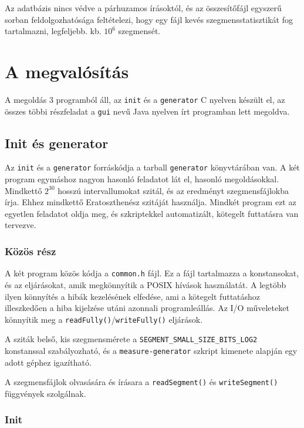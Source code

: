 Az adatbázis nincs védve a párhuzamos írásoktól, és az összesítőfájl egyszerű sorban feldolgozhatósága feltételezi, hogy egy fájl kevés szegmensstatisztikát fog tartalmazni, legfeljebb. kb. $10^6$ szegmensét.

\section{A megvalósítás}

A megoldás 3 programból áll, az \texttt{init} és a \texttt{generator} C nyelven készült el, az összes többi részfeladat a \texttt{gui} nevű Java nyelven írt programban lett megoldva.

\subsection{Init és generator}

Az \texttt{init} és a \texttt{generator} forráskódja a tarball \texttt{generator} könyvtárában van.
A két program egymáshoz nagyon hasonló feladatot lát el, hasonló megoldásokkal.
Mindkettő $2^{30}$ hosszú intervallumokat szitál, és az eredményt szegmensfájlokba írja.
Ehhez mindkettő Eratoszthenész szitáját használja.
Mindkét program ezt az egyetlen feladatot oldja meg, és szkriptekkel automatizált, kötegelt futtatásra van tervezve.

\subsubsection{Közös rész}

A két program közös kódja a \texttt{common.h} fájl.
Ez a fájl tartalmazza a konstansokat, és az eljárásokat, amik megkönnyítik a POSIX hívások használatát.
A legtöbb ilyen könnyítés a hibák kezelésének elfedése, ami a kötegelt futtatáshoz illeszkedően
a hiba kijelzése utáni azonnali programleállás.
Az I/O műveleteket könnyítik meg a \texttt{readFully()}/\texttt{writeFully()} eljárások.

A sziták belső, kis szegmensmérete a \texttt{SEGMENT\_SMALL\_SIZE\_BITS\_LOG2} konstanssal szabályozható, és a \texttt{measure-generator} szkript kimenete alapján egy adott géphez igazítható.

A szegmensfájlok olvasására és írásara a \texttt{readSegment()} és \texttt{writeSegment()} függvények szolgálnak.

\subsubsection{Init}

